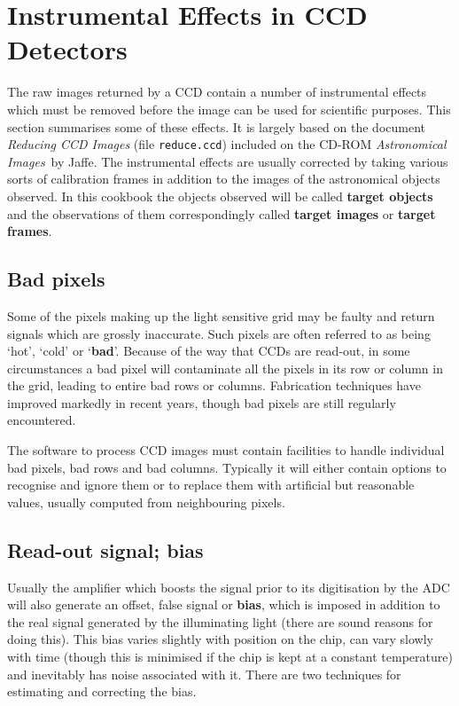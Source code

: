 \documentclass[twoside,11pt]{article}
\newcommand{\xlabel}[1]{}
\begin{document}
\section{\xlabel{EASY}\label{EASY}Instrumental Effects in CCD Detectors}

The raw images returned by a CCD contain a number of instrumental
effects which must be removed before the image can be used for scientific
purposes.  This section summarises some of these effects.  It is largely
based on the document {\it Reducing CCD Images}\/ (file {\tt reduce.ccd})
included on the CD-ROM {\it Astronomical Images}\, by Jaffe\cite{JAFFE98}.
The instrumental effects are usually corrected by taking various sorts
of calibration frames in addition to the images of the astronomical objects
observed.  In this cookbook the objects observed will be called {\bf
target objects} and the observations of them correspondingly called {\bf
target images} or {\bf target frames}.

\subsection{Bad pixels}

Some of the pixels making up the light sensitive grid may be faulty and 
return signals which are grossly inaccurate.  Such pixels are often
referred to as being `hot', `cold' or `{\bf bad}'.  Because of the way that
CCDs are read-out, in some circumstances a bad pixel will contaminate
all the pixels in its row or column in the grid, leading to entire
bad rows or columns.  Fabrication techniques have improved markedly in 
recent years, though bad pixels are still regularly encountered.

The software to process CCD images must contain facilities to
handle individual bad pixels, bad rows and bad columns.  Typically
it will either contain options to recognise and ignore them or to
replace them with artificial but reasonable values, usually computed
from neighbouring pixels.

\subsection{\label{BIAS_1}Read-out signal; bias}

Usually the amplifier which boosts the signal prior to its digitisation
by the ADC will also generate an offset, false signal or {\bf bias}, which
is imposed in addition to the real signal generated by the illuminating
light (there are sound reasons for doing this).  This bias varies slightly
with position on the chip, can vary slowly with time (though this is
minimised if the chip is kept at a constant temperature) and inevitably
has noise associated with it.  There are two techniques for estimating
and correcting the bias.
\end{document}
